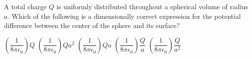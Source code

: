 \begin{questions}\setcounter{question}{34}\question
A total charge $Q$ is uniformly distributed throughout a spherical volume of radius $a$. Which of the following is a dimensionally correct expression for the potential difference between the center of the sphere and its surface?

\begin{oneparchoices}
\choice $\left(\dfrac{1}{8 \pi \epsilon_{0}}\right) Q$
\choice $\left(\dfrac{1}{8 \pi \epsilon_{0}}\right) Q a^{2}$
\choice $\left(\dfrac{1}{8 \pi \epsilon_{0}}\right) Q a$
\choice $\left(\dfrac{1}{8 \pi \epsilon_{0}}\right) \dfrac{Q}{a}$
\choice $\left(\dfrac{1}{8 \pi \epsilon_{0}}\right) \dfrac{Q}{a^{2}}$
\end{oneparchoices}\end{questions}

